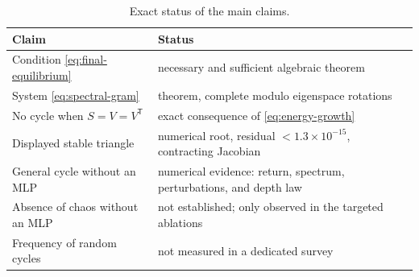 \documentclass[11pt,a4paper]{article}
\theoremstyle{definition}
\newcommand{\T}{\mathsf T}
\begin{document}
\begin{table}[ht]
\centering
\caption{Exact status of the main claims.}
\begin{tabularx}{\textwidth}{@{}lX@{}}
\toprule
Claim & Status \\
\midrule
Condition \eqref{eq:final-equilibrium} & necessary and sufficient algebraic theorem \\
System \eqref{eq:spectral-gram} & theorem, complete modulo eigenspace rotations \\
No cycle when $S=V=V^{\T}$ & exact consequence of \eqref{eq:energy-growth} \\
Displayed stable triangle & numerical root, residual $<1.3\times10^{-15}$, contracting Jacobian \\
General cycle without an MLP & numerical evidence: return, spectrum, perturbations, and depth law \\
Absence of chaos without an MLP & not established; only observed in the targeted ablations \\
Frequency of random cycles & not measured in a dedicated survey \\
\bottomrule
\end{tabularx}
\end{table}


{\small}
\end{document}
